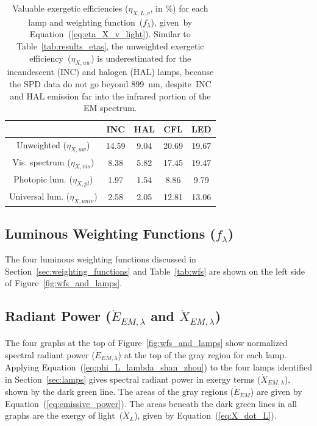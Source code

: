\documentclass[energies,article,accept,moreauthors,pdftex]{Definitions/mdpi}\usepackage[]{graphicx}\usepackage[]{color}
\begin{document}
\begin{table}[H]
\centering
\caption{Valuable exergetic efficiencies
                     ($\eta_{X,L,v}$, in \%) for each lamp
                     and weighting function~($f_\lambda$),
                     \mbox{given by} Equation~(\ref{eq:eta_X_v_light}).
                     Similar to Table~\ref{tab:results_etas}, 
                     the unweighted exergetic efficiency~($\eta_{X,uw}$) is 
                     underestimated for the incandescent (INC) and halogen (HAL) lamps, because
                     the SPD data do not go beyond 899~nm, 
                     \mbox{despite INC} and HAL emission far into 
                     the infrared portion of the EM spectrum.} 
\label{tab:results_etasX}
\begingroup\footnotesize
\begin{tabular}{ccccc}
  \toprule
 & \textbf{INC} & \textbf{HAL} & \textbf{CFL} & \textbf{LED} \\ 
  \midrule
Unweighted ($\eta_{X,uw}$) & 14.59 & 9.04 & 20.69 & 19.67 \\ 
  Vis. spectrum ($\eta_{X,vis}$) & 8.38 & 5.82 & 17.45 & 19.47 \\ 
  Photopic lum. ($\eta_{X,pl}$) & 1.97 & 1.54 & 8.86 & 9.79 \\ 
  Universal lum. ($\eta_{X,univ}$) & 2.58 & 2.05 & 12.81 & 13.06 \\ 
   \bottomrule
\end{tabular}
\endgroup
\end{table}
\subsection{Luminous Weighting Functions ($f_\lambda$)}
\label{sec:results_weighting_functions}

The four luminous weighting functions 
discussed in Section~\ref{sec:weighting_functions} and Table~\ref{tab:wfs}
are shown on the left side of Figure~\ref{fig:wfs_and_lamps}.


\subsection{Radiant Power ($\dot{E}_{EM,\lambda}$ and $\dot{X}_{EM,\lambda}$)}
\label{sec:results_radiant_power}

The four graphs at the top of Figure~\ref{fig:wfs_and_lamps}
show normalized spectral radiant power ($\dot{E}_{EM,\lambda}$) 
at the top of the gray region for each lamp.
Applying Equation~(\ref{eq:phi_L_lambda_shan_zhou}) 
to the four lamps identified in Section~\ref{sec:lamps}
gives spectral radiant power in exergy terms ($\dot{X}_{EM,\lambda}$),
shown by the dark green line.
The areas of the gray regions ($\dot{E}_{EM}$) are given by Equation~(\ref{eq:emissive_power}).
The areas beneath the dark green lines in all graphs are the exergy of light~($\dot{X}_L$), 
given by Equation~(\ref{eq:X_dot_L}).
\end{document}
